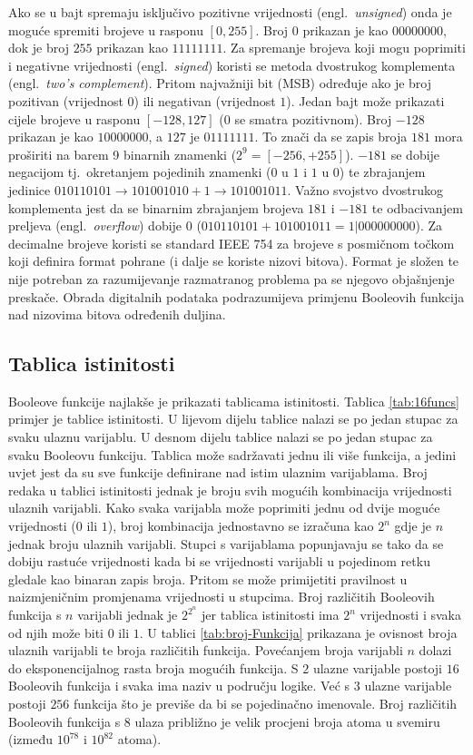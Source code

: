 \documentclass[times, utf8, diplomski]{fer}
\begin{document}
Ako se u bajt spremaju isključivo pozitivne vrijednosti (engl.~\textit{unsigned}) onda je moguće spremiti brojeve u rasponu $[0, 255]$. Broj $0$ prikazan je kao $00000000$, dok je broj $255$ prikazan kao $11111111$. Za spremanje brojeva koji mogu poprimiti i negativne vrijednosti (engl.~\textit{signed}) koristi se metoda dvostrukog komplementa (engl.~\textit{two's complement}). Pritom najvažniji bit (MSB) određuje ako je broj pozitivan (vrijednost $0$) ili negativan (vrijednost $1$). Jedan bajt može prikazati cijele brojeve u rasponu $[-128, 127]$ ($0$ se smatra pozitivnom). Broj $-128$ prikazan je kao $10000000$, a $127$ je $01111111$. To znači da se zapis broja $181$ mora proširiti na barem 9 binarnih znamenki ($2^{9}=[-256, +255]$). $-181$ se dobije negacijom tj.~okretanjem pojedinih znamenki ($0$ u $1$ i $1$ u $0$) te zbrajanjem jedinice $010110101 \to 101001010 + 1 \to 101001011$. Važno svojstvo dvostrukog komplementa jest da se binarnim zbrajanjem brojeva $181$ i $-181$ te odbacivanjem preljeva (engl.~\textit{overflow}) dobije $0$ ($010110101 + 101001011 = 1|000000000$). Za decimalne brojeve koristi se standard IEEE 754 za brojeve s posmičnom točkom koji definira format pohrane (i dalje se koriste nizovi bitova). Format je složen te nije potreban za razumijevanje razmatranog problema pa se njegovo objašnjenje preskače. Obrada digitalnih podataka podrazumijeva primjenu Booleovih funkcija nad nizovima bitova određenih duljina.

\subsection{Tablica istinitosti}

Booleove funkcije najlakše je prikazati tablicama istinitosti. Tablica \ref{tab:16funcs} primjer je tablice istinitosti. U lijevom dijelu tablice nalazi se po jedan stupac za svaku ulaznu varijablu. U desnom dijelu tablice nalazi se po jedan stupac za svaku Booleovu funkciju. Tablica može sadržavati jednu ili više funkcija, a jedini uvjet jest da su sve funkcije definirane nad istim ulaznim varijablama. Broj redaka u tablici istinitosti jednak je broju svih mogućih kombinacija vrijednosti ulaznih varijabli. Kako svaka varijabla može poprimiti jednu od dvije moguće vrijednosti ($0$ ili $1$), broj kombinacija jednostavno se izračuna kao $2^{n}$ gdje je $n$ jednak broju ulaznih varijabli. Stupci s varijablama popunjavaju se tako da se dobiju rastuće vrijednosti kada bi se vrijednosti varijabli u pojedinom retku gledale kao binaran zapis broja. Pritom se može primijetiti pravilnost u naizmjeničnim promjenama vrijednosti u stupcima. Broj različitih Booleovih funkcija s $n$ varijabli jednak je $2^{2^{n}}$ jer tablica istinitosti ima $2^{n}$ vrijednosti i svaka od njih može biti $0$ ili $1$. U tablici \ref{tab:broj-Funkcija} prikazana je ovisnost broja ulaznih varijabli te broja različitih funkcija. Povećanjem broja varijabli $n$ dolazi do eksponencijalnog rasta broja mogućih funkcija. S $2$ ulazne varijable postoji $16$ Booleovih funkcija i svaka ima naziv u području logike. Već s $3$ ulazne varijable postoji $256$ funkcija što je previše da bi se pojedinačno imenovale. Broj različitih Booleovih funkcija s $8$ ulaza približno je velik procjeni broja atoma u svemiru (između $10^{78}$ i $10^{82}$ atoma).
\end{document}
